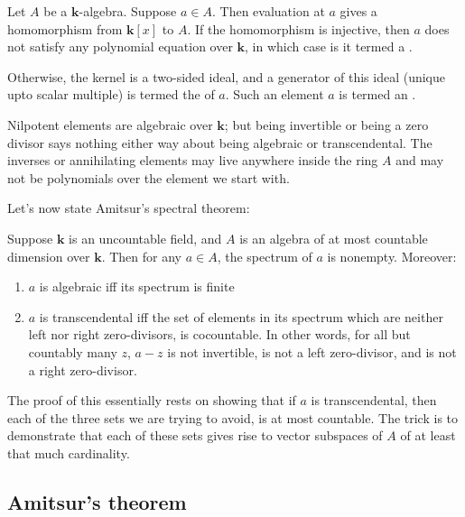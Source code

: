 \documentclass[a4paper]{amsart}
\newcommand{\field}{\mathbf{k}}
\begin{document}
Let $A$ be a $\field$-algebra. Suppose $a \in A$. Then evaluation at
$a$ gives a homomorphism from $\field[x]$ to $A$. If the homomorphism
is injective, then $a$ does not satisfy any polynomial equation over
$\field$, in which case is it termed a
.

Otherwise, the kernel is a two-sided ideal, and a generator of this
ideal (unique upto scalar multiple) is termed the  of $a$. Such an element $a$ is termed an
.

Nilpotent elements are algebraic over $\field$; but being invertible
or being a zero divisor says nothing either way about being algebraic
or transcendental. The inverses or annihilating elements may live
anywhere inside the ring $A$ and may not be polynomials over the
element we start with.

Let's now state Amitsur's spectral theorem:

\begin{theorem}
  Suppose $\field$ is an uncountable field, and
  $A$ is an algebra of at most countable dimension over $\field$. Then
  for any $a \in A$, the spectrum of $a$ is nonempty. Moreover:

  \begin{enumerate}

  \item $a$ is algebraic iff its spectrum is finite

  \item $a$ is transcendental iff the set of elements in its spectrum
    which are neither left nor right zero-divisors, is cocountable. In
    other words, for all but countably many $z$, $a - z$ is not
    invertible, is not a left zero-divisor, and is not a right
    zero-divisor.

  \end{enumerate}
\end{theorem}

The proof of this essentially rests on showing that if $a$ is
transcendental, then each of the three sets we are trying to avoid, is
at most countable. The trick is to demonstrate that each of these sets
gives rise to vector subspaces of $A$ of at least that much
cardinality.

\subsection{Amitsur's theorem}
\end{document}
